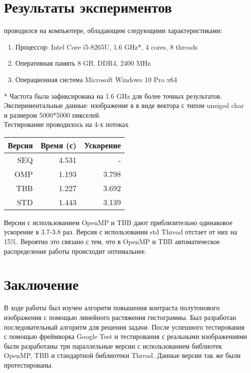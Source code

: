 \documentclass{report}
\begin{document}
    \newpage
    \section*{Результаты экспериментов}
    
     проводился на компьютере, обладающим следующими характеристиками:
    \begin{enumerate}
        \item Процессор: Intel Core i5-8265U, 1.6 GHz*, 4 cores, 8 threads
        \item Оперативная память 8 GB, DDR4, 2400 MHz
        \item Операционная система Microsoft Windows 10 Pro x64
    \end{enumerate}
    * Частота была зафиксирована на 1.6 GHz для более точных результатов. \\
    Экспериментальные данные: изображение в в виде вектора с типом unsiged char и размером 5000*5000 пикселей.\\
    Тестирование проводилось на 4-х потоках.
    \begin{table}[!h]
    \centering
    \begin{tabular}{| r | r | r |}
    \hline
    Версия & Время (с) & Ускорение \\[5pt]
    \hline
    SEQ & 4.531 & -     \\
    OMP & 1.193 & 3.798 \\
    TBB & 1.227 & 3.692 \\
    STD & 1.443 & 3.139 \\
    \hline
    \end{tabular}
    \end{table}
    
    \par Версии с использованием OpenMP и TBB дают приблизительно одинаковое ускорение в 3.7-3.8 раз. Версия с использовании std Thread отстает от них на 15\%. Вероятно это связано с тем, что в OpenMP и TBB автоматическое распределение работы происходит оптимальнее. 
    
    \newpage
	\section*{Заключение}
	
	\par В ходе работы был изучен алгоритм повышения контраста полутонового изображения с помощью линейного растяжения гистограммы. Был разработан последовательный алгоритм для решения задачи. После успешного тестирования с помощью фреймворка Google Test и тестирования с реальными изображениями были разработаны три параллельные версии с использованием библиотек OpenMP, TBB и стандартной библиотеки Thread. Данные версии так же были протестированы.
	
\end{document}
